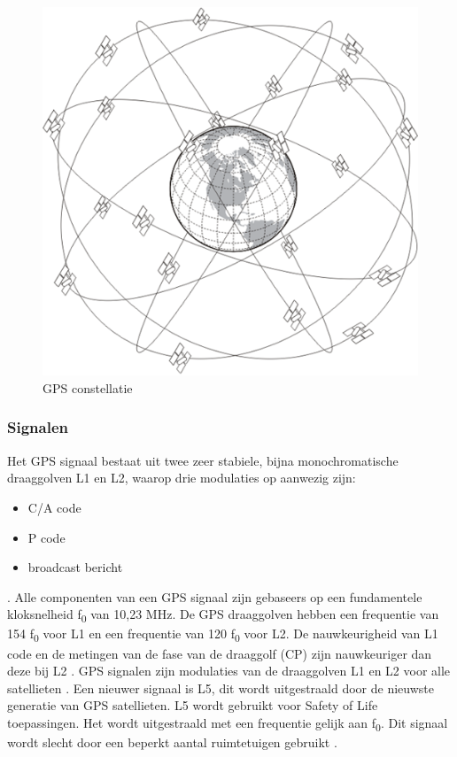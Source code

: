  \begin{figure}[hpb]
 	\includegraphics[scale=1]{GPS.png}
 	\caption{GPS constellatie \cite{LImgGPS}}
 	\label{imgGPS}
 \end{figure}

\subsubsection{Signalen}
Het GPS signaal bestaat uit twee zeer stabiele, bijna monochromatische draaggolven L1 en L2, waarop drie modulaties op aanwezig zijn:
\begin{itemize}
	\item C/A code
	\item P code
	\item broadcast bericht
\end{itemize}. 
Alle componenten van een GPS signaal zijn gebaseers op een fundamentele kloksnelheid f\textsubscript{0} van 10,23 MHz. De GPS draaggolven hebben een frequentie van 154 f\textsubscript{0} voor L1 en een frequentie van 120 f\textsubscript{0} voor L2\cite{LBibGPS2}. De nauwkeurigheid van L1 code en de metingen van de fase van de draaggolf (CP) zijn nauwkeuriger dan deze bij L2 \cite{LBibBeiDou4}. GPS signalen zijn modulaties van de draaggolven L1 en L2 voor alle satellieten \cite{LBibGPS3}. Een nieuwer signaal is L5, dit wordt uitgestraald door de nieuwste generatie van GPS satellieten. L5 wordt gebruikt voor Safety of Life toepassingen. Het wordt uitgestraald met een frequentie gelijk aan f\textsubscript{0}. Dit signaal wordt slecht door een beperkt aantal ruimtetuigen gebruikt \cite{LBibGNSS9}.

